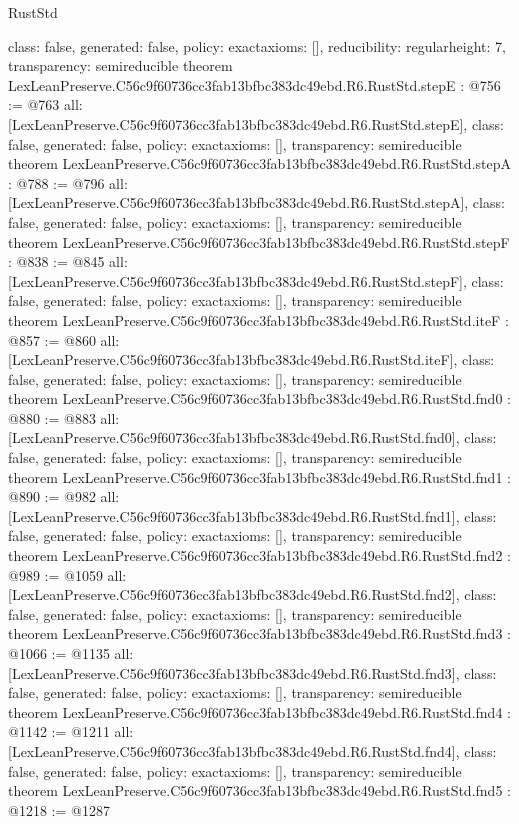 \begin{lexlean}{RustStd}
\begin{coremodule}
{  class: false,
  generated: false,
  policy: exact{axioms: []},
  reducibility: regular{height: 7},
  transparency: semireducible
}
theorem LexLeanPreserve.C56c9f60736cc3fab13bfbc383dc49ebd.R6.RustStd.stepE : @756 := @763 {
  all: [LexLeanPreserve.C56c9f60736cc3fab13bfbc383dc49ebd.R6.RustStd.stepE],
  class: false,
  generated: false,
  policy: exact{axioms: []},
  transparency: semireducible
}
theorem LexLeanPreserve.C56c9f60736cc3fab13bfbc383dc49ebd.R6.RustStd.stepA : @788 := @796 {
  all: [LexLeanPreserve.C56c9f60736cc3fab13bfbc383dc49ebd.R6.RustStd.stepA],
  class: false,
  generated: false,
  policy: exact{axioms: []},
  transparency: semireducible
}
theorem LexLeanPreserve.C56c9f60736cc3fab13bfbc383dc49ebd.R6.RustStd.stepF : @838 := @845 {
  all: [LexLeanPreserve.C56c9f60736cc3fab13bfbc383dc49ebd.R6.RustStd.stepF],
  class: false,
  generated: false,
  policy: exact{axioms: []},
  transparency: semireducible
}
theorem LexLeanPreserve.C56c9f60736cc3fab13bfbc383dc49ebd.R6.RustStd.iteF : @857 := @860 {
  all: [LexLeanPreserve.C56c9f60736cc3fab13bfbc383dc49ebd.R6.RustStd.iteF],
  class: false,
  generated: false,
  policy: exact{axioms: []},
  transparency: semireducible
}
theorem LexLeanPreserve.C56c9f60736cc3fab13bfbc383dc49ebd.R6.RustStd.fnd0 : @880 := @883 {
  all: [LexLeanPreserve.C56c9f60736cc3fab13bfbc383dc49ebd.R6.RustStd.fnd0],
  class: false,
  generated: false,
  policy: exact{axioms: []},
  transparency: semireducible
}
theorem LexLeanPreserve.C56c9f60736cc3fab13bfbc383dc49ebd.R6.RustStd.fnd1 : @890 := @982 {
  all: [LexLeanPreserve.C56c9f60736cc3fab13bfbc383dc49ebd.R6.RustStd.fnd1],
  class: false,
  generated: false,
  policy: exact{axioms: []},
  transparency: semireducible
}
theorem LexLeanPreserve.C56c9f60736cc3fab13bfbc383dc49ebd.R6.RustStd.fnd2 : @989 := @1059 {
  all: [LexLeanPreserve.C56c9f60736cc3fab13bfbc383dc49ebd.R6.RustStd.fnd2],
  class: false,
  generated: false,
  policy: exact{axioms: []},
  transparency: semireducible
}
theorem LexLeanPreserve.C56c9f60736cc3fab13bfbc383dc49ebd.R6.RustStd.fnd3 : @1066 := @1135 {
  all: [LexLeanPreserve.C56c9f60736cc3fab13bfbc383dc49ebd.R6.RustStd.fnd3],
  class: false,
  generated: false,
  policy: exact{axioms: []},
  transparency: semireducible
}
theorem LexLeanPreserve.C56c9f60736cc3fab13bfbc383dc49ebd.R6.RustStd.fnd4 : @1142 := @1211 {
  all: [LexLeanPreserve.C56c9f60736cc3fab13bfbc383dc49ebd.R6.RustStd.fnd4],
  class: false,
  generated: false,
  policy: exact{axioms: []},
  transparency: semireducible
}
theorem LexLeanPreserve.C56c9f60736cc3fab13bfbc383dc49ebd.R6.RustStd.fnd5 : @1218 := @1287 {
}
\end{coremodule}
\end{lexlean}
